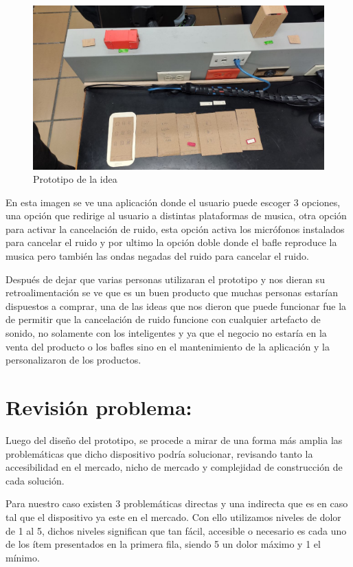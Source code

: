 \documentclass[conference,compsoc,onecolumn]{IEEEtran}
\begin{document}
\begin{figure}[H]
    \centering
    \includegraphics[width=16cm]{imagenes/photo1643818599.jpeg}
    \caption{Prototipo de la idea}
    \label{fig:galaxy}
\end{figure}

En esta imagen se ve una aplicación donde el usuario puede escoger 3 opciones, una opción que redirige al usuario  a distintas plataformas de musica, otra opción para activar la cancelación de ruido, esta opción activa los micrófonos instalados para cancelar el ruido y por ultimo la opción doble donde el bafle reproduce la musica pero también las ondas negadas del ruido para cancelar el ruido.\bigskip


Después de dejar que varias personas utilizaran el prototipo y nos dieran su retroalimentación  se ve que es un buen producto que muchas personas estarían dispuestos a comprar, una de las ideas que nos dieron que puede funcionar fue la de permitir que la cancelación de ruido funcione con cualquier artefacto de sonido, no solamente con los inteligentes y ya que el negocio no estaría en la venta del producto o los bafles sino en el mantenimiento de la aplicación y la personalizaron de los productos.\bigskip

\section{Revisión problema: }
Luego del diseño del prototipo, se procede a mirar de una forma más amplia las problemáticas que dicho dispositivo podría solucionar, revisando tanto la accesibilidad en el mercado, nicho de mercado y complejidad de construcción de cada solución.\bigskip

Para nuestro caso existen 3 problemáticas directas y una indirecta que es en caso tal que el dispositivo ya este en el mercado. Con ello utilizamos niveles de dolor de 1 al 5, dichos niveles significan que tan fácil, accesible o necesario es cada uno de los ítem presentados en la primera fila, siendo 5 un dolor máximo y 1 el mínimo.\bigskip
\end{document}
